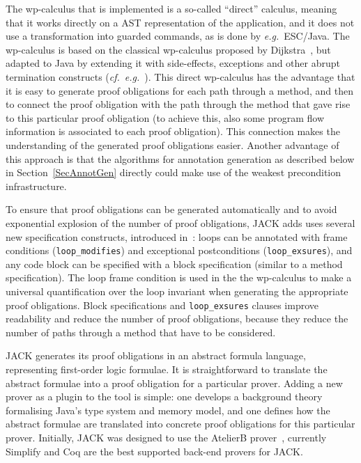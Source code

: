 The wp-calculus that is implemented is a
so-called ``direct'' calculus, meaning that it works directly on a AST
representation of the application, and it does not use a
transformation into guarded commands, as is done by \emph{e.g.}\
ESC/Java.  The wp-calculus is based on the classical wp-calculus
proposed by Dijkstra~\cite{Dijkstra75}, but adapted to Java by
extending it with side-effects, exceptions and other abrupt
termination constructs (\emph{cf.}\
\emph{e.g.}~\cite{Jacobs04}). This direct wp-calculus has the advantage
that it is easy to generate proof obligations for each path through a
method, and then to connect the proof obligation with the path through
the method that gave rise to this particular proof obligation (to
achieve this, also some program flow information is associated to each
proof obligation). This connection makes the understanding of the
generated proof obligations easier. Another advantage of this approach
is that the algorithms for annotation generation as described below in
Section~\ref{SecAnnotGen} directly could make use of the weakest
precondition infrastructure.


To ensure that proof obligations can be generated automatically and to
avoid exponential explosion of the number of proof obligations, JACK
adds uses several new specification constructs, introduced
in~\cite{BurdyRL03}: loops can be annotated with frame conditions
(\texttt{loop\_modifies}) and exceptional postconditions
(\texttt{loop\_exsures}), and any code block can be specified with a
block specification (similar to a method specification). The loop
frame condition is used in the the wp-calculus to make a universal
quantification over the loop invariant when generating the appropriate
proof obligations. Block specifications and
\texttt{loop\_exsures} clauses improve readability and reduce the
number of proof obligations, because they reduce the number of paths
through a method that have to be considered.


JACK generates its proof obligations in an abstract formula language,
representing first-order logic formulae. It is straightforward to
translate the abstract formulae into a proof obligation for a
particular prover. Adding a new prover as a plugin to the tool is
simple: one develops a background theory formalising Java's type
system and memory model, and one defines how the abstract formulae are
translated into concrete proof obligations for this particular
prover. Initially, JACK was designed to use the AtelierB
prover~\cite{Abrial96}, currently Simplify and Coq are the best
supported back-end provers for JACK.




